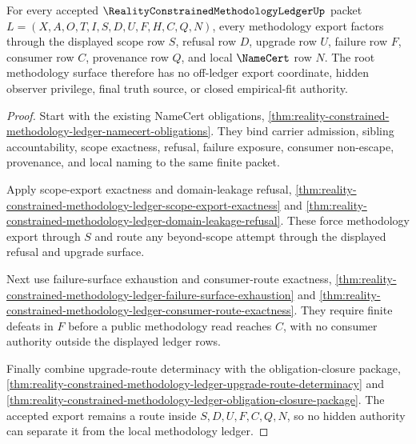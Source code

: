 \begin{theorem}
\label{thm:reality-constrained-methodology-ledger-root-methodology-export-totality}
For every accepted $\RealityConstrainedMethodologyLedgerUp$ packet
$L=(X,A,O,T,I,S,D,U,F,H,C,Q,N)$, every methodology export factors through the
displayed scope row $S$, refusal row $D$, upgrade row $U$, failure row $F$,
consumer row $C$, provenance row $Q$, and local $\NameCert$ row $N$. The root
methodology surface therefore has no off-ledger export coordinate, hidden
observer privilege, final truth source, or closed empirical-fit authority.
\end{theorem}
\begin{proof}
Start with the existing NameCert obligations,
\autoref{thm:reality-constrained-methodology-ledger-namecert-obligations}. They
bind carrier admission, sibling accountability, scope exactness, refusal,
failure exposure, consumer non-escape, provenance, and local naming to the same
finite packet.

Apply scope-export exactness and domain-leakage refusal,
\autoref{thm:reality-constrained-methodology-ledger-scope-export-exactness}
and
\autoref{thm:reality-constrained-methodology-ledger-domain-leakage-refusal}.
These force methodology export through $S$ and route any beyond-scope attempt
through the displayed refusal and upgrade surface.

Next use failure-surface exhaustion and consumer-route exactness,
\autoref{thm:reality-constrained-methodology-ledger-failure-surface-exhaustion}
and
\autoref{thm:reality-constrained-methodology-ledger-consumer-route-exactness}.
They require finite defeats in $F$ before a public methodology read reaches
$C$, with no consumer authority outside the displayed ledger rows.

Finally combine upgrade-route determinacy with the obligation-closure package,
\autoref{thm:reality-constrained-methodology-ledger-upgrade-route-determinacy}
and
\autoref{thm:reality-constrained-methodology-ledger-obligation-closure-package}.
The accepted export remains a route inside $S,D,U,F,C,Q,N$, so no hidden
authority can separate it from the local methodology ledger.
\end{proof}

